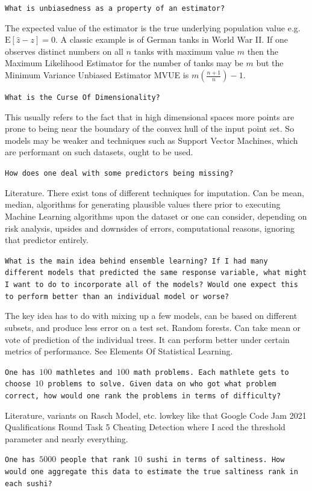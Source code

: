 \texttt{What is unbiasedness as a property of an estimator?}

The expected value of the estimator is the true underlying population value e.g. $\text{E}[\hat{z}-z] = 0$. A classic example is of German tanks in World War II. If one observes distinct numbers on all $n$ tanks with maximum value $m$ then the Maximum Likelihood Estimator for the number of tanks may be $m$ but the Minimum Variance Unbiased Estimator MVUE is $m \left ( \frac{n+1}{n} \right ) - 1$.

\texttt{What is the Curse Of Dimensionality?}

This usually refers to the fact that in high dimensional spaces more points are prone to being near the boundary of the convex hull of the input point set. So models may be weaker and techniques such as Support Vector Machines, which are performant on such datasets, ought to be used.

\texttt{How does one deal with some predictors being missing?}

Literature. There exist tons of different techniques for imputation. Can be mean, median, algorithms for generating plausible values there prior to executing Machine Learning algorithms upon the dataset or one can consider, depending on risk analysis, upsides and downsides of errors, computational reasons, ignoring that predictor entirely.

\texttt{What is the main idea behind ensemble learning? If I had many different models that predicted the same response variable, what might I want to do to incorporate all of the models? Would one expect this to perform better than an individual model or worse?}

The key idea has to do with mixing up a few models, can be based on different subsets, and produce less error on a test set. Random forests. Can take mean or vote of prediction of the individual trees. It can perform better under certain metrics of performance. See Elements Of Statistical Learning.

\texttt{One has $100$ mathletes and $100$ math problems. Each mathlete gets to choose $10$ problems to solve. Given data on who got what problem correct, how would one rank the problems in terms of difficulty?}

Literature, variants on Rasch Model, etc. lowkey like that Google Code Jam 2021 Qualifications Round Task 5 Cheating Detection where I aced the threshold parameter and nearly everything.

\texttt{One has $5000$ people that rank $10$ sushi in terms of saltiness. How would one aggregate this data to estimate the true saltiness rank in each sushi?}

